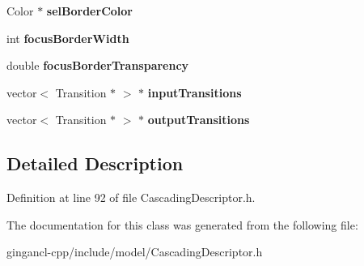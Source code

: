 \begin{CompactItemize}
\item 
Color $\ast$ {\bf selBorderColor}\label{classbr_1_1pucrio_1_1telemidia_1_1ginga_1_1ncl_1_1model_1_1presentation_1_1CascadingDescriptor_27f93dc1f28d7dc3124bcaa429e7f6f5}

\item 
int {\bf focusBorderWidth}\label{classbr_1_1pucrio_1_1telemidia_1_1ginga_1_1ncl_1_1model_1_1presentation_1_1CascadingDescriptor_df0527ed65dd7e08a0f61791ddba65ee}

\item 
double {\bf focusBorderTransparency}\label{classbr_1_1pucrio_1_1telemidia_1_1ginga_1_1ncl_1_1model_1_1presentation_1_1CascadingDescriptor_3939ea7cbc9bb3b8251742096281aa06}

\item 
vector$<$ Transition $\ast$ $>$ $\ast$ {\bf inputTransitions}\label{classbr_1_1pucrio_1_1telemidia_1_1ginga_1_1ncl_1_1model_1_1presentation_1_1CascadingDescriptor_c3d6940c9bb9f37b16d1a11ebde161b7}

\item 
vector$<$ Transition $\ast$ $>$ $\ast$ {\bf outputTransitions}\label{classbr_1_1pucrio_1_1telemidia_1_1ginga_1_1ncl_1_1model_1_1presentation_1_1CascadingDescriptor_51c15fcc3ec6834eb1db5df3bddbb02e}

\end{CompactItemize}


\subsection{Detailed Description}




Definition at line 92 of file CascadingDescriptor.h.

The documentation for this class was generated from the following file:\begin{CompactItemize}
\item 
gingancl-cpp/include/model/CascadingDescriptor.h\end{CompactItemize}
